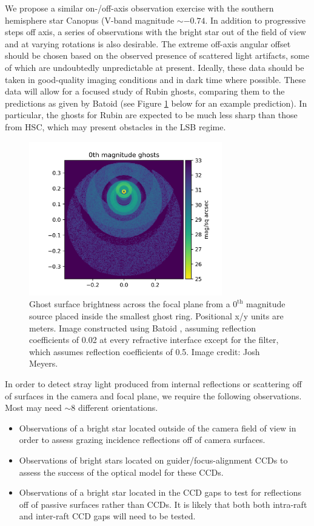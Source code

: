 \documentclass[SE,authoryear,toc]{lsstdoc}
\begin{document}
We propose a similar on-/off-axis observation exercise with the southern hemisphere star Canopus (V-band magnitude $\sim-0.74$.
In addition to progressive steps off axis, a series of observations with the bright star out of the field of view and at varying rotations is also desirable.
The extreme off-axis angular offset should be chosen based on the observed presence of scattered light artifacts, some of which are undoubtedly unpredictable at present.
Ideally, these data should be taken in good-quality imaging conditions and in dark time where possible.
These data will allow for a focused study of Rubin ghosts, comparing them to the predictions as given by Batoid (see Figure \ref{fig:ghosts_rubin} below for an example prediction).
In particular, the ghosts for Rubin are expected to be much less sharp than those from HSC, which may present obstacles in the LSB regime.

\begin{figure}
\centering
\includegraphics[width=0.75\textwidth]{fig/ghosts_rubin}
\caption{
Ghost surface brightness across the focal plane from a $0^{\mathrm{th}}$ magnitude source placed inside the smallest ghost ring.
Positional x/y units are meters.
Image constructed using Batoid \citep{Meyers2019}, assuming reflection coefficients of 0.02 at every refractive interface except for the filter, which assumes reflection coefficients of 0.5.
Image credit: Josh Meyers.
}
\label{fig:ghosts_rubin}
\end{figure}

In order to detect stray light produced from internal reflections or scattering off of surfaces in the camera and focal plane, we require the following observations.
Most may need $\sim$8 different orientations.
\begin{itemize}
    \item Observations of a bright star located outside of the camera field of view in order to assess grazing incidence reflections off of camera surfaces.
    \item Observations of bright stars located on guider/focus-alignment CCDs to assess the success of the optical model for these CCDs.
    \item Observations of a bright star located in the CCD gaps to test for reflections off of passive surfaces rather than CCDs. 
          It is likely that both both intra-raft and inter-raft CCD gaps will need to be tested.
\end{itemize}
\end{document}
